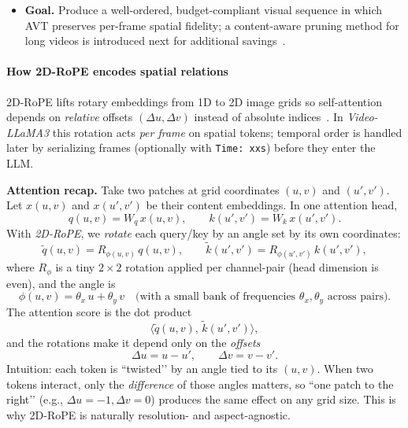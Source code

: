 \begin{enrichment}
\begin{enrichment}
\begin{itemize}
\begin{itemize}
\begin{itemize}
                    \item \emph{Fixed $2{\times}2$ spatial downsampling (post\mbox{-}encoder):} apply $2{\times}2$ pooling over the token grid to reduce each $K_t$ while preserving aspect.
                \end{itemize}
                \item \textbf{Goal.} Produce a well\mbox{-}ordered, budget\mbox{-}compliant visual sequence in which AVT preserves per\mbox{-}frame spatial fidelity; a content\mbox{-}aware pruning method for long videos is introduced next for additional savings~\cite[Sec.~3.1--3.2]{zhang2025_videollama3}.
            \end{itemize}
            
        \end{itemize}
        
        \paragraph{How 2D\mbox{-}RoPE encodes spatial relations}
        2D\mbox{-}RoPE lifts rotary embeddings from 1D to 2D image grids so self\mbox{-}attention depends on \emph{relative} offsets $(\Delta u,\Delta v)$ instead of absolute indices~\cite{heo2024_rotarype,zhang2025_videollama3}. In \emph{Video\mbox{-}LLaMA3} this rotation acts \emph{per frame} on spatial tokens; temporal order is handled later by serializing frames (optionally with \texttt{Time: xxs}) before they enter the LLM.
        
        \textbf{Attention recap.} \;
        Take two patches at grid coordinates $(u,v)$ and $(u',v')$. Let $x(u,v)$ and $x(u',v')$ be their content embeddings. In one attention head,
        \[
        q(u,v)=W_q\,x(u,v),\qquad k(u',v')=W_k\,x(u',v') .
        \]
        With \emph{2D-RoPE}, we \emph{rotate} each query/key by an angle set by its own coordinates:
        \[
        \tilde q(u,v)=R_{\phi(u,v)}\,q(u,v),\qquad
        \tilde k(u',v')=R_{\phi(u',v')}\,k(u',v') ,
        \]
        where $R_{\phi}$ is a tiny $2{\times}2$ rotation applied per channel\mbox{-}pair (head dimension is even), and the angle is
        \[
        \phi(u,v)=\theta_x\,u+\theta_y\,v
        \quad\text{(with a small bank of frequencies $\theta_x,\theta_y$ across pairs).}
        \]
        The attention score is the dot product
        \[
        \big\langle \tilde q(u,v),\,\tilde k(u',v') \big\rangle,
        \]
        and the rotations make it depend only on the \emph{offsets}
        \[
        \Delta u = u-u',\qquad \Delta v = v-v' .
        \]
        Intuition: each token is “twisted’’ by an angle tied to its $(u,v)$. When two tokens interact, only the \emph{difference} of those angles matters, so “one patch to the right’’ (e.g., $\Delta u=-1,\Delta v=0$) produces the same effect on any grid size. This is why 2D\mbox{-}RoPE is naturally resolution\mbox{-} and aspect\mbox{-}agnostic.
        

\end{enrichment}
\end{enrichment}

